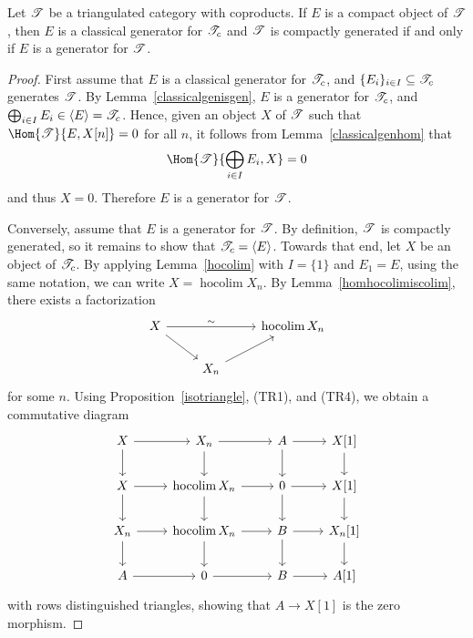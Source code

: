 \documentclass[10pt]{amsart}
\begin{document}
\begin{prop}
  Let $\mathscr{T}$ be a triangulated category with coproducts.
  If $E$ is a compact object of $\mathscr{T}$, then
  $E$ is a classical generator for $\mathscr{T}_c$ and $\mathscr{T}$ is compactly generated 
  if and only if
  $E$ is a generator for $\mathscr{T}$.
  
  \begin{proof}
    First assume that $E$ is a classical generator for $\mathscr{T}_c$, and $\{E_i\}_{i \in I} \subseteq \mathscr{T}_c$ generates $\mathscr{T}$.
    By Lemma~\ref{classicalgenisgen}, $E$ is a generator for $\mathscr{T}_c$, and $\bigoplus_{i \in I}E_i \in \langle E \rangle = \mathscr{T}_c$.
    Hence, given an object $X$ of $\mathscr{T}$ such that $\Hom{\T}{E,X[n]} = 0$ for all $n$, it follows from Lemma~\ref{classicalgenhom} that
    $$\Hom{\T}{\bigoplus_{i \in I}E_i, X} = 0$$
    and thus $X = 0$.
    Therefore $E$ is a generator for $\mathscr{T}$.
    
    Conversely, assume that $E$ is a generator for $\mathscr{T}$.
    By definition, $\mathscr{T}$ is compactly generated, so it remains to show that $\mathscr{T}_c = \langle E \rangle$.
    Towards that end, let $X$ be an object of $\mathscr{T}_c$.
    By applying Lemma~\ref{hocolim} with $I = \{1\}$ and $E_1 = E$, using the same notation, we can write $X = \operatorname{hocolim}X_n$.
    By Lemma~\ref{homhocolimiscolim}, there exists a factorization
    $$\begin{tikzcd}
      X \arrow{rd}\arrow{rr}{\sim} & & \operatorname{hocolim} X_n\\
      & X_n\arrow{ur}
    \end{tikzcd}$$
    for some $n$.
    Using Proposition~\ref{isotriangle}, (TR1), and (TR4), we obtain a commutative diagram 
    $$\begin{tikzcd}
      X \arrow{r}\arrow{d} & X_n \arrow{r}\arrow{d} & A \arrow{d}\arrow{r} & X[1]\arrow{d}\\
      X \arrow{d}\arrow{r} & \operatorname{hocolim}X_n \arrow{d}\arrow{r} & 0 \arrow{d}\arrow{r} & X[1]\arrow{d}\\
      X_n \arrow{d}\arrow{r} & \operatorname{hocolim}X_n \arrow{d}\arrow{r} & B \arrow{r}\arrow{d} & X_n[1]\arrow{d}\\
      A \arrow{r} & 0 \arrow{r} & B \arrow{r} & A[1]
    \end{tikzcd}$$
    with rows distinguished triangles, showing that $A \rightarrow X[1]$ is the zero morphism.
    

\end{proof}
\end{prop}
\end{document}
